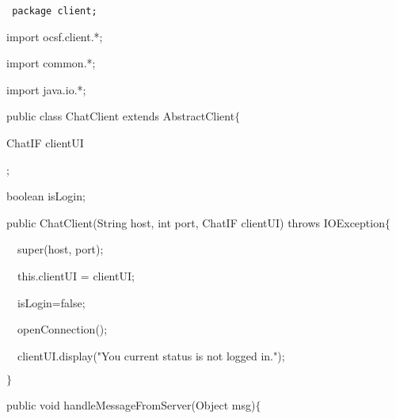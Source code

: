 


{
\tt
{\hlstd }{\hlkwa package }{\hlstd client}{\hlsym ;}\leavevmode\par
{\hlstd }\leavevmode\par
{\hlkwa import }{\hlstd ocsf}{\hlsym .}{\hlstd client}{\hlsym .*;}\leavevmode\par
{\hlstd }{\hlkwa import }{\hlstd common}{\hlsym .*;}\leavevmode\par
{\hlstd }{\hlkwa import }{\hlstd java}{\hlsym .}{\hlstd io}{\hlsym .*;}\leavevmode\par
{\hlstd }\leavevmode\par
{\hlkwa public class }{\hlstd ChatClient }{\hlkwa extends }{\hlstd AbstractClient}{\hlsym $\{$}\leavevmode\par
{\hlstd \leavevmode\par
	ChatIF clientUI}{\hlsym ;}\leavevmode\par
{\hlstd 	}{\hlkwb boolean }{\hlstd isLogin}{\hlsym ;}\leavevmode\par
{\hlstd \leavevmode\par
	}{\hlkwa public }{\hlstd }{\hlkwd ChatClient}{\hlstd }{\hlsym (}{\hlstd }{\hlkwc String }{\hlstd host}{\hlsym , }{\hlstd }{\hlkwb int }{\hlstd port}{\hlsym , }{\hlstd ChatIF clientUI}{\hlsym ) }{\hlstd }{\hlkwa throws }{\hlstd }{\hlkwc IOException}{\hlstd }{\hlsym $\{$}\leavevmode\par
{\hlstd }{\hlstd\ \ }{\hlstd }{\hlkwa super}{\hlstd }{\hlsym (}{\hlstd host}{\hlsym , }{\hlstd port}{\hlsym );}\leavevmode\par
{\hlstd }{\hlstd\ \ }{\hlstd }{\hlkwa this}{\hlstd }{\hlsym .}{\hlstd clientUI }{\hlsym $\mathord{=}$ }{\hlstd clientUI}{\hlsym ;}\leavevmode\par
{\hlstd }{\hlstd\ \ }{\hlstd isLogin}{\hlsym $\mathord{=}$}{\hlstd false}{\hlsym ;}\leavevmode\par
{\hlstd }{\hlstd\ \ }{\hlstd }{\hlkwd openConnection}{\hlstd }{\hlsym ();}\leavevmode\par
{\hlstd }{\hlstd\ \ }{\hlstd clientUI}{\hlsym .}{\hlstd }{\hlkwd display}{\hlstd }{\hlsym (}{\hlstd }{\hlstr "You current status is not logged in."}{\hlstd }{\hlsym );}\leavevmode\par
{\hlstd 	}{\hlsym $\}$}\leavevmode\par
{\hlstd \leavevmode\par
	}{\hlkwa public }{\hlstd }{\hlkwb void }{\hlstd }{\hlkwd handleMessageFromServer}{\hlstd }{\hlsym (}{\hlstd }{\hlkwc Object }{\hlstd msg}{\hlsym )$\{$}\leavevmode\par
}
